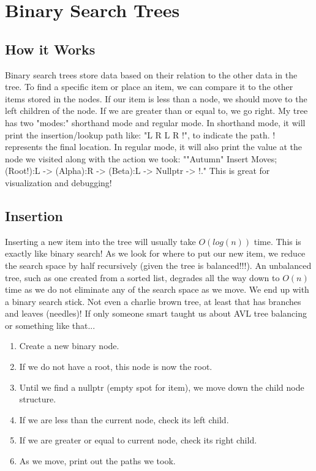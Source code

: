 \documentclass[letterpaper, 10pt]{article}
\begin{document}
\section{Binary Search Trees}
\subsection{How it Works}
Binary search trees store data based on their relation to the other data in the tree. To find a specific item or place an item, we can compare it to the other items stored in the nodes. If our item is less than a node, we should move to the left children of the node. If we are greater than or equal to, we go right. My tree has two "modes:" shorthand mode and regular mode. In shorthand mode, it will print the insertion/lookup path like: "L R L R !", to indicate the path. ! represents the final location. In regular mode, it will also print the value at the node we visited along with the action we took: ""Autumn" Insert Moves; (Root!):L -\textgreater{} (Alpha):R -\textgreater{} (Beta):L -\textgreater{} Nullptr -\textgreater{} !." This is great for visualization and debugging! \\


\subsection{Insertion}
Inserting a new item into the tree will usually take $O(log(n))$ time. This is exactly like binary search! As we look for where to put our new item, we reduce the search space by half recursively (given the tree is balanced!!!). An unbalanced tree, such as one created from a sorted list, degrades all the way down to $O(n)$ time as we do not eliminate any of the search space as we move. We end up with a binary search stick. Not even a charlie brown tree, at least that has branches and leaves (needles)! If only someone smart taught us about AVL tree balancing or something like that...
\begin{enumerate}
    \item Create a new binary node.
    \item If we do not have a root, this node is now the root.
    \item Until we find a nullptr (empty spot for item), we move down the child node structure.
    \item If we are less than the current node, check its left child.
    \item If we are greater or equal to current node, check its right child.
    \item As we move, print out the paths we took.
\end{enumerate}

\end{document}
